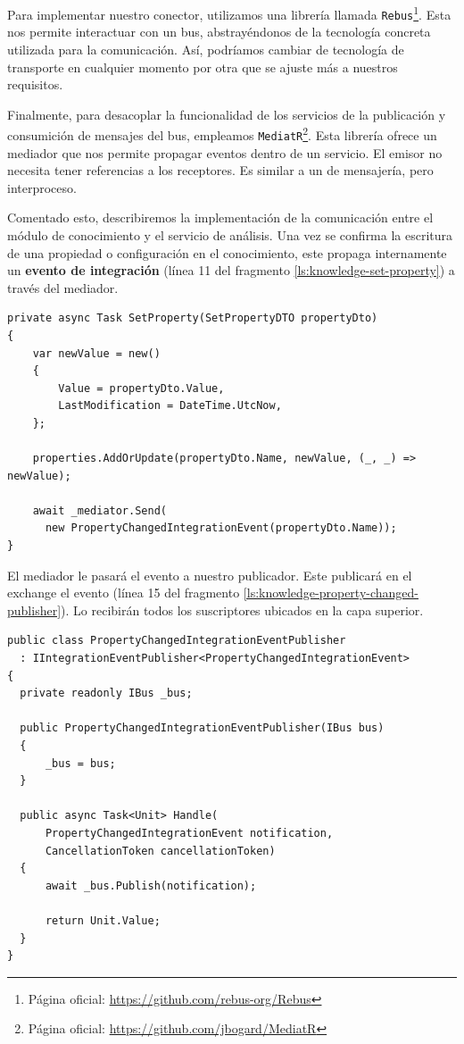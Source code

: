 Para implementar nuestro conector, utilizamos una librería llamada \texttt{Rebus}\footnote{Página oficial: \url{https://github.com/rebus-org/Rebus}}. Esta nos permite interactuar con un bus, abstrayéndonos de la tecnología concreta utilizada para la comunicación. Así, podríamos cambiar de tecnología de transporte en cualquier momento por otra que se ajuste más a nuestros requisitos.

Finalmente, para desacoplar la funcionalidad de los servicios de la publicación y consumición de mensajes del bus, empleamos \texttt{MediatR}\footnote{Página oficial: \url{https://github.com/jbogard/MediatR}}. Esta librería ofrece un mediador que nos permite propagar eventos dentro de un servicio. El emisor no necesita tener referencias a los receptores. Es similar a un  de mensajería, pero interproceso.

Comentado esto, describiremos la implementación de la comunicación entre el módulo de conocimiento y el servicio de análisis. Una vez se confirma la escritura de una propiedad o configuración en el conocimiento, este propaga internamente un \textbf{evento de integración} (línea 11 del fragmento \ref{ls:knowledge-set-property}) a través del mediador.


\begin{lstlisting}[language={[Sharp]C},caption={Implementación del método que asigna valor a una propiedad. Muestra un ejemplo de propagación interna de eventos de integración.},captionpos=b, label=ls:knowledge-set-property]
private async Task SetProperty(SetPropertyDTO propertyDto)
{
    var newValue = new()
    {
        Value = propertyDto.Value,
        LastModification = DateTime.UtcNow,
    };

    properties.AddOrUpdate(propertyDto.Name, newValue, (_, _) => newValue);

    await _mediator.Send(
      new PropertyChangedIntegrationEvent(propertyDto.Name));
}

\end{lstlisting}

El mediador le pasará el evento a nuestro publicador. Este publicará en el exchange el evento  (línea 15 del fragmento \ref{ls:knowledge-property-changed-publisher}). Lo recibirán todos los suscriptores ubicados en la capa superior.

\begin{lstlisting}[language={[Sharp]C},caption={El publicador de eventos captura el evento de integración que se propaga internamente, y lo publica en el bus.},captionpos=b, label=ls:knowledge-property-changed-publisher]
public class PropertyChangedIntegrationEventPublisher
  : IIntegrationEventPublisher<PropertyChangedIntegrationEvent>
{
  private readonly IBus _bus;

  public PropertyChangedIntegrationEventPublisher(IBus bus)
  {
      _bus = bus;
  }

  public async Task<Unit> Handle(
      PropertyChangedIntegrationEvent notification,
      CancellationToken cancellationToken)
  {
      await _bus.Publish(notification);

      return Unit.Value;
  }
}
\end{lstlisting}

